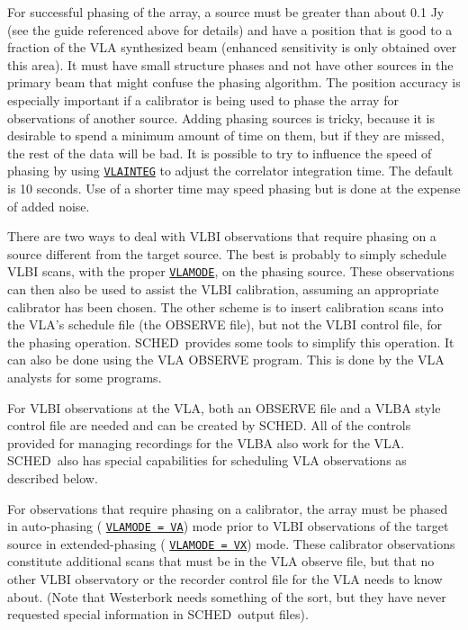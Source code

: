 \documentclass{report}
\newcommand{\sched}{{\sc SCHED}}
\newcommand{\schedb}{{\sc SCHED~}}
\begin{document}
For successful phasing of the array, a source must be greater than
about 0.1 Jy (see the guide referenced above for details) and have a
position that is good to a fraction of the VLA synthesized beam
(enhanced sensitivity is only obtained over this area).  It must have
small structure phases and not have other sources in the primary beam
that might confuse the phasing algorithm.  The position accuracy is
especially important if a calibrator is being used to phase the array
for observations of another source.  Adding phasing sources is tricky,
because it is desirable to spend a minimum amount of time on them, but
if they are missed, the rest of the data will be bad.  It is possible
to try to influence the speed of phasing by using 
{\hyperref[MP:VLAINTEG]{{\tt VLAINTEG}}}
to adjust the correlator integration time.  The default
is 10 seconds.  Use of a shorter time may speed phasing but is done at
the expense of added noise.

There are two ways to deal with VLBI observations that require
phasing on a source different from the target source.  The best
is probably to simply schedule VLBI scans, with the proper 
{\hyperref[MP:VLAMODE]{{\tt VLAMODE}}},
on the phasing source.  These observations
can then also be used to assist the VLBI calibration, assuming an
appropriate calibrator has been chosen.  The other scheme is to
insert calibration scans into the VLA's schedule file (the OBSERVE
file), but not the VLBI control file, for the phasing operation.
\schedb provides some tools to simplify this operation.  It can
also be done using the {\sc VLA OBSERVE} program.  This is done
by the VLA analysts for some programs.

For VLBI observations at the VLA, both an OBSERVE file and a VLBA
style control file are needed and can be created by \sched.  All of
the controls provided for managing recordings for the VLBA also work
for the VLA.  \schedb also has special capabilities for scheduling VLA
observations as described below.

For observations that require phasing on a calibrator, the array must
be phased in auto-phasing (
{\hyperref[MP:VLAMODE]{{\tt VLAMODE = VA}}})
mode prior to VLBI observations of the target source in
extended-phasing (
{\hyperref[MP:VLAMODE]{{\tt VLAMODE = VX}}}) mode.
These calibrator observations constitute additional scans that must be
in the VLA observe file, but that no other VLBI observatory or the
recorder control file for the VLA needs to know about. (Note that
Westerbork needs something of the sort, but they have never requested
special information in \schedb output files).
\end{document}
